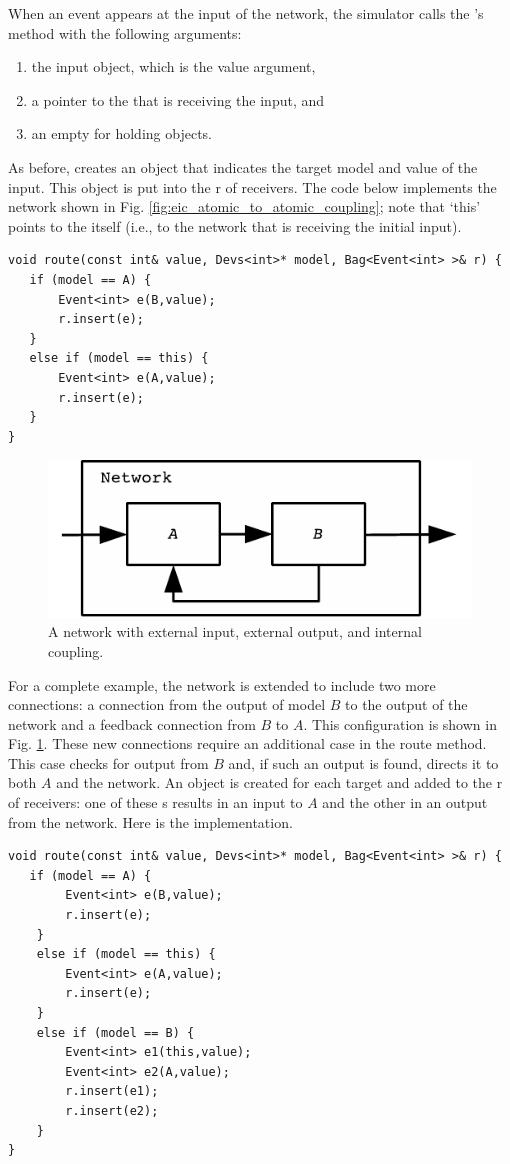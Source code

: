 When an event appears at the input of the network, the simulator calls the 's  method with the following arguments:
\begin{enumerate}
\item the input object, which is the value argument,
\item a pointer to the  that is receiving the input, and
\item an empty  for holding  objects.
\end{enumerate} 
As before,  creates an  object that indicates the target model and value of the input. This  object is put into the  r of receivers. The code below implements the network shown in Fig. \ref{fig:eic_atomic_to_atomic_coupling}; note that `this' points to the  itself (i.e., to the network that is receiving the initial input).
\begin{verbatim}
void route(const int& value, Devs<int>* model, Bag<Event<int> >& r) {
   if (model == A) {
       Event<int> e(B,value);
       r.insert(e);
   }
   else if (model == this) {
       Event<int> e(A,value);
       r.insert(e);
   }
}
\end{verbatim}

\begin{figure}[ht]
\centering
\includegraphics{network_models_figs/big_coupled.pdf}
\caption{A network with external input, external output, and internal coupling.}
\label{fig:big_coupling}
\end{figure} 
For a complete example, the network is extended to include two more connections: a connection from the output of model $B$ to the output of the network and a feedback connection from $B$ to $A$. This configuration is shown in Fig. \ref{fig:big_coupling}. These new connections require an additional case in the route method. This case checks for output from $B$ and, if such an output is found, directs it to both $A$ and the network. An  object is created for each target and added to the  r of receivers: one of these s results in an input to $A$ and the other in an output from the network. Here is the implementation.
\begin{verbatim}
void route(const int& value, Devs<int>* model, Bag<Event<int> >& r) {
   if (model == A) {
        Event<int> e(B,value);
        r.insert(e);
    }
    else if (model == this) {
        Event<int> e(A,value);
        r.insert(e);
    }
    else if (model == B) {
        Event<int> e1(this,value);
        Event<int> e2(A,value);
        r.insert(e1);
        r.insert(e2);
    }
}
\end{verbatim}

